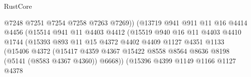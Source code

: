 \begin{lexlean}{RustCore}
\begin{coremodule}
                                        @7248
                                        @7251
                                        @7254
                                        @7258
                                        @7263
                                        @7269))
                                    (@13719
                                      @941
                                      @911
                                      @11
                                      @16
                                      @4414
                                      @4456
                                      (@15514
                                        @941
                                        @11
                                        @4403
                                        @4412
                                        (@15519
                                          @940
                                          @16
                                          @11
                                          @4403
                                          @4410
                                          @1744
                                          (@15393
                                            @893
                                            @11
                                            @15
                                            @4372
                                            @4402
                                            @4409
                                            @1127
                                            @4351
                                            @1133
                                            (@15406
                                              @4372
                                              (@15417
                                                @4359
                                                @4367
                                                @15422
                                                @8558
                                                @8564
                                                @8636
                                                @8198
                                                (@5141 (@8583 @4367 @4360))
                                                @6668))
                                            (@15396
                                              @4399
                                              @1149
                                              @1166
                                              @1127
                                              @4378

\end{coremodule}
\end{lexlean}
